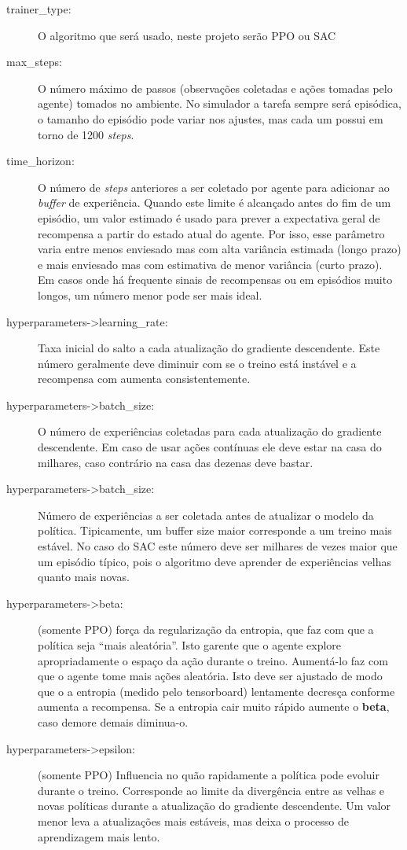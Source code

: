 \begin{description}
   \item [trainer\_type:] O algoritmo que será usado, neste projeto serão PPO ou SAC
   \item [max\_steps:] O número máximo de passos (observações coletadas e ações tomadas pelo agente) tomados  no ambiente. No simulador a tarefa sempre será episódica, o tamanho do episódio pode variar nos ajustes, mas cada um possui em torno de 1200 \textit{steps}.
   \item [time\_horizon:] O número de \textit{steps} anteriores a ser coletado por agente para adicionar ao \textit{buffer} de experiência. Quando este limite é alcançado antes do fim de um episódio, um valor estimado é usado para prever a expectativa geral de recompensa a partir do estado atual do agente. Por isso, esse parâmetro varia entre menos enviesado mas com alta variância estimada (longo prazo) e mais enviesado mas com estimativa de menor variância (curto prazo). Em casos onde há frequente sinais de recompensas ou em episódios muito longos, um número menor pode ser mais ideal.
   \item [hyperparameters->learning\_rate:] Taxa inicial do salto a cada atualização do gradiente descendente. Este número geralmente deve diminuir com se o treino está instável e a recompensa com aumenta consistentemente.
   \item [hyperparameters->batch\_size:] O número de experiências coletadas para cada atualização do gradiente descendente. Em caso de usar ações contínuas ele deve estar na casa do milhares, caso contrário na casa das dezenas deve bastar.
   \item [hyperparameters->batch\_size:] Número de experiências a ser coletada antes de atualizar o modelo da política. Tipicamente, um buffer size maior corresponde a um treino mais estável. No caso do SAC este número deve ser milhares de vezes maior que um episódio típico, pois o algoritmo deve aprender de experiências velhas quanto mais novas.
   \item [hyperparameters->beta:] (somente PPO) força da regularização da entropia, que faz com que a política seja ``mais aleatória''. Isto garente que o agente explore apropriadamente o espaço da ação durante o treino. Aumentá-lo faz com que o agente tome mais ações aleatória. Isto deve ser ajustado de modo que o a entropia (medido pelo tensorboard) lentamente decresça conforme aumenta a recompensa. Se a entropia cair muito rápido aumente o \textbf{beta}, caso demore demais diminua-o.
   \item [hyperparameters->epsilon:] (somente PPO) Influencia no quão rapidamente a política pode evoluir durante o treino. Corresponde ao limite da divergência entre as velhas e novas políticas durante a atualização do gradiente descendente. Um valor menor leva a atualizações mais estáveis, mas deixa o processo de aprendizagem mais lento.

\end{description}
